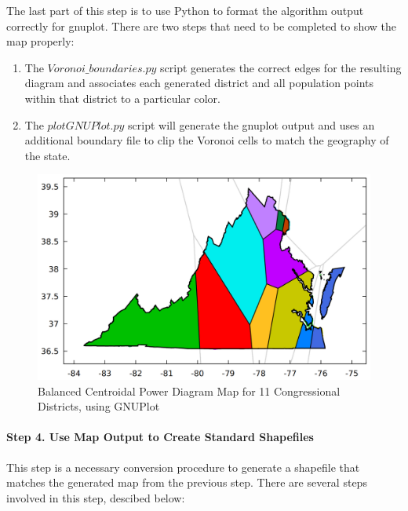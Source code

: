 \documentclass[11pt]{article}
\begin{document}
The last part of this step is to use Python to format the algorithm output correctly for gnuplot. There are two steps that need to be completed to show the map properly:
\begin{enumerate}
	\item The $Voronoi\_boundaries.py$ script generates the correct edges for the resulting diagram and associates each generated district and all population points within that district to a particular color.
	\item The $plotGNUPlot.py$ script will generate the gnuplot output and uses an additional boundary file to clip the Voronoi cells to match the geography of the state.
\end{enumerate}

\begin{figure}[H]
	\centering
	\includegraphics[width=.55\textwidth]{VoronoiMap11}
	\caption{Balanced Centroidal Power Diagram Map for 11 Congressional Districts, using GNUPlot}
	\label{fig:vmap11}
\end{figure}

\paragraph{Step 4. Use Map Output to Create Standard Shapefiles}

This step is a necessary conversion procedure to generate a shapefile that matches the generated map from the previous step. There are several steps involved in this step, descibed below:
\end{document}

